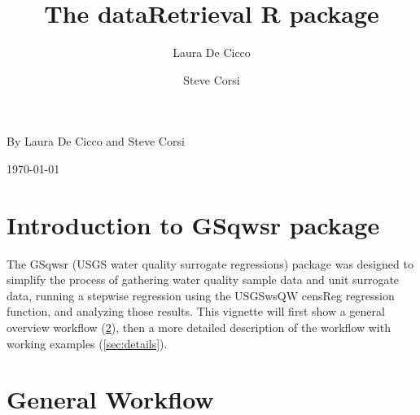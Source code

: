 \documentclass[a4paper,11pt]{article}\usepackage[]{graphicx}\usepackage[]{color}
\begin{document}
\renewenvironment{knitrout}{\begin{singlespace}}{\end{singlespace}}
\renewcommand*\listfigurename{Figures}

\renewcommand*\listtablename{Tables}


\title{The dataRetrieval R package}
\author[1]{Laura De Cicco}
\author[1]{Steve Corsi}





\noindent\textsf{By Laura De Cicco and Steve Corsi}

\noindent\textsf{\today}

% 

\tableofcontents
\listoffigures
\listoftables

\newpage


\section{Introduction to GSqwsr package}
The GSqwsr (USGS water quality surrogate regressions) package was designed to simplify the process of gathering water quality sample data and unit surrogate data, running a stepwise regression using the USGSwsQW censReg regression function, and analyzing those results. This vignette will first show a general overview workflow  (\ref{sec:workflow}), then a more detailed description of the workflow with working examples (\ref{sec:details}).

\section{General Workflow}
\label{sec:workflow}
\end{document}
